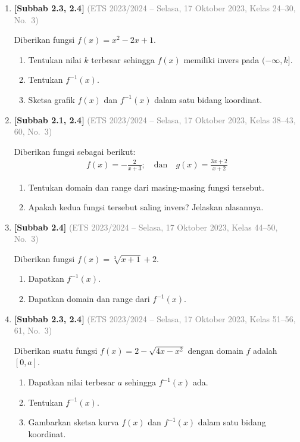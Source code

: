 \documentclass[10pt,openany,a4paper]{article}
\theoremstyle{definition}
\theoremstyle{definition}
\theoremstyle{plain}
\begin{document}
\begin{enumerate}
    \item \textbf{[Subbab 2.3, 2.4]} {\footnotesize\textcolor{gray}{(ETS 2023/2024 -- Selasa, 17 Oktober 2023, Kelas 24--30, No.~3)}}\par
    Diberikan fungsi $f(x)=x^2-2x+1$.
    \begin{enumerate}
        \item Tentukan nilai $k$ terbesar sehingga $f(x)$ memiliki invers pada $(-\infty,k]$.
        \item Tentukan $f^{-1}(x)$.
        \item Sketsa grafik $f(x)$ dan $f^{-1}(x)$ dalam satu bidang koordinat.
    \end{enumerate}

    \item \textbf{[Subbab 2.1, 2.4]} {\footnotesize\textcolor{gray}{(ETS 2023/2024 -- Selasa, 17 Oktober 2023, Kelas 38--43, 60, No.~3)}}\par
    Diberikan fungsi sebagai berikut:
    \begin{align*}
        f(x)=-\frac{2}{x+3};\quad \text{dan}\quad g(x)=\frac{3x+2}{x+2}
    \end{align*}
    \begin{enumerate}
        \item Tentukan domain dan range dari masing-masing fungsi tersebut.
        \item Apakah kedua fungsi tersebut saling invers? Jelaskan alasannya.
    \end{enumerate}

    \item \textbf{[Subbab 2.4]} {\footnotesize\textcolor{gray}{(ETS 2023/2024 -- Selasa, 17 Oktober 2023, Kelas 44--50, No.~3)}}\par
    Diberikan fungsi $f(x)=\sqrt[3]{x+1}+2$.
    \begin{enumerate}
        \item Dapatkan $f^{-1}(x)$.
        \item Dapatkan domain dan range dari $f^{-1}(x)$.
    \end{enumerate}

    \item \textbf{[Subbab 2.3, 2.4]} {\footnotesize\textcolor{gray}{(ETS 2023/2024 -- Selasa, 17 Oktober 2023, Kelas 51--56, 61, No.~3)}}\par
    Diberikan suatu fungsi $f(x)=2-\sqrt{4x-x^2}$ dengan domain $f$ adalah $[0,a]$.
    \begin{enumerate}
        \item Dapatkan nilai terbesar $a$ sehingga $f^{-1}(x)$ ada.
        \item Tentukan $f^{-1}(x)$.
        \item Gambarkan sketsa kurva $f(x)$ dan $f^{-1}(x)$ dalam satu bidang koordinat.
    \end{enumerate}


\end{enumerate}
\end{document}
